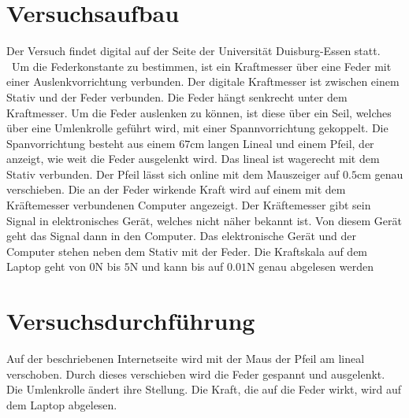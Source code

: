 %

%
\section{Versuchsaufbau}
Der Versuch findet digital auf der Seite der Universität Duisburg-Essen 
\cite{Hook_Interaktiv} statt. \
Um die Federkonstante zu bestimmen, ist ein Kraftmesser über eine Feder mit einer Auslenkvorrichtung verbunden.
Der digitale Kraftmesser ist zwischen einem Stativ und der Feder verbunden. Die Feder hängt senkrecht unter dem Kraftmesser.
Um die Feder auslenken zu können, ist diese über ein Seil, welches über eine Umlenkrolle geführt wird, mit einer 
Spannvorrichtung gekoppelt. Die Spanvorrichtung besteht aus einem $67 \unit{\centi \meter}$ langen Lineal und einem Pfeil, 
der anzeigt, wie weit die Feder ausgelenkt wird. Das lineal ist wagerecht mit dem Stativ verbunden. Der Pfeil lässt sich online 
mit dem Mauszeiger auf $0.5 \unit{\centi \meter}$ genau verschieben. %
Die an der Feder wirkende Kraft wird auf einem mit dem Kräftemesser verbundenen Computer angezeigt. Der Kräftemesser 
gibt sein Signal in elektronisches Gerät, welches nicht näher bekannt ist. Von diesem Gerät geht das Signal dann in den 
Computer. Das elektronische Gerät und der Computer stehen neben dem Stativ mit der Feder. Die Kraftskala auf dem Laptop geht 
von $0 \unit{\newton}$ bis $5 \unit{\newton}$ und kann bis auf $0.01 \unit{\newton}$ genau abgelesen werden


\section{Versuchsdurchführung}
\label{sec:Versuhsdurchfuehrung}
Auf der beschriebenen Internetseite wird mit der Maus der Pfeil am lineal verschoben. Durch dieses verschieben wird die Feder 
gespannt und ausgelenkt. Die Umlenkrolle ändert ihre Stellung. Die Kraft, die auf die Feder wirkt, wird auf dem Laptop 
abgelesen.

